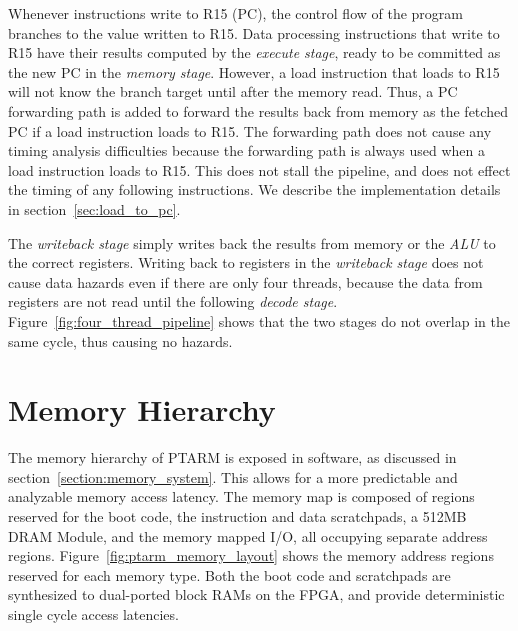 Whenever instructions write to R15 (PC), the control flow of the program branches to the value written to R15.
Data processing instructions that write to R15 have their results computed by the \emph{execute stage}, ready to be committed as the new PC in the \emph{memory stage}.    
However, a load instruction that loads to R15 will not know the branch target until after the memory read.
Thus, a PC forwarding path is added to forward the results back from memory as the fetched PC if a load instruction loads to R15.  
The forwarding path does not cause any timing analysis difficulties because the forwarding path is always used when a load instruction loads to R15.
This does not stall the pipeline, and does not effect the timing of any following instructions.
We describe the implementation details in section~\ref{sec:load_to_pc}. 

The \emph{writeback stage} simply writes back the results from memory or the \emph{ALU} to the correct registers.
Writing back to registers in the \emph{writeback stage} does not cause data hazards even if there are only four threads, because the data from registers are not read until the following \emph{decode stage}.
Figure~\ref{fig:four_thread_pipeline} shows that the two stages do not overlap in the same cycle, thus causing no hazards.  

\section{Memory Hierarchy}
\label{sec:ptarm_memory}
The memory hierarchy of PTARM is exposed in software, as discussed in section~\ref{section:memory_system}.
This allows for a more predictable and analyzable memory access latency. 
The memory map is composed of regions reserved for the boot code, the instruction and data scratchpads, a 512MB DRAM Module, and the memory mapped I/O, all occupying separate address regions.
Figure~\ref{fig:ptarm_memory_layout} shows the memory address regions reserved for each memory type.
Both the boot code and scratchpads are synthesized to dual-ported block RAMs on the FPGA, and provide deterministic single cycle access latencies.

